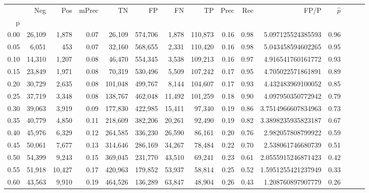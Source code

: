 \begin{tabular}{rrrrrrrrrrrrrrr}
\toprule
{} &     Neg &     Pos & mPrec &       TN &       FP &       FN &       TP &  Prec &   Rec &                  FP/P & $\hat{p}$ \\
p    &         &         &       &          &          &          &          &       &       &                       &           \\
\midrule
0.00 &  26,109 &   1,878 &  0.07 &   26,109 &  574,706 &    1,878 &  110,873 &  0.16 &  0.98 &     5.097125524385593 &      0.96 \\
0.05 &   6,051 &     453 &  0.07 &   32,160 &  568,655 &    2,331 &  110,420 &  0.16 &  0.98 &     5.043458594602265 &      0.95 \\
0.10 &  14,310 &   1,207 &  0.08 &   46,470 &  554,345 &    3,538 &  109,213 &  0.16 &  0.97 &     4.916541760161772 &      0.93 \\
0.15 &  23,849 &   1,971 &  0.08 &   70,319 &  530,496 &    5,509 &  107,242 &  0.17 &  0.95 &     4.705022571861891 &      0.89 \\
0.20 &  30,729 &   2,635 &  0.08 &  101,048 &  499,767 &    8,144 &  104,607 &  0.17 &  0.93 &     4.432483969100052 &      0.85 \\
0.25 &  37,719 &   3,348 &  0.08 &  138,767 &  462,048 &   11,492 &  101,259 &  0.18 &  0.90 &     4.097950350772942 &      0.79 \\
0.30 &  39,063 &   3,919 &  0.09 &  177,830 &  422,985 &   15,411 &   97,340 &  0.19 &  0.86 &    3.7514966607834963 &      0.73 \\
0.35 &  40,779 &   4,850 &  0.11 &  218,609 &  382,206 &   20,261 &   92,490 &  0.19 &  0.82 &    3.3898235935823187 &      0.67 \\
0.40 &  45,976 &   6,329 &  0.12 &  264,585 &  336,230 &   26,590 &   86,161 &  0.20 &  0.76 &     2.982057808799922 &      0.59 \\
0.45 &  50,061 &   7,677 &  0.13 &  314,646 &  286,169 &   34,267 &   78,484 &  0.22 &  0.70 &     2.538061746680739 &      0.51 \\
0.50 &  54,399 &   9,243 &  0.15 &  369,045 &  231,770 &   43,510 &   69,241 &  0.23 &  0.61 &    2.0555915246871423 &      0.42 \\
0.55 &  51,918 &  10,427 &  0.17 &  420,963 &  179,852 &   53,937 &   58,814 &  0.25 &  0.52 &    1.5951255421237949 &      0.33 \\
0.60 &  43,563 &   9,910 &  0.19 &  464,526 &  136,289 &   63,847 &   48,904 &  0.26 &  0.43 &     1.208760897907779 &      0.26 \\

\end{tabular}
